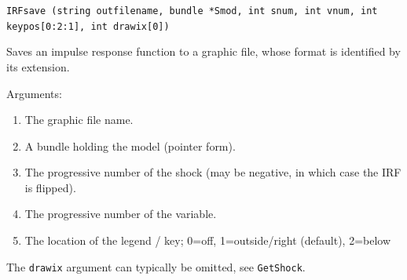 \documentclass[a4paper,10pt]{article}
\newenvironment{funcdoc}[1]
{\noindent\hrulefill\newline\nopagebreak\texttt{#1}%
\nopagebreak\par\noindent\hrulefill%
\nopagebreak\par\nopagebreak\smallskip\nopagebreak\par}
{\bigskip}
\begin{document}

\begin{funcdoc}{IRFsave (string outfilename, bundle *Smod, int snum, int vnum, 
int keypos[0:2:1], int drawix[0])}
   \noindent Saves an impulse response function to a graphic file, whose format is
  identified by its extension. 
    
  \noindent Arguments:
  
  \begin{enumerate}
  \item The graphic file name.
  \item A bundle holding the model (pointer form).
  \item The progressive number of the shock (may be negative, in which
    case the IRF is flipped).
  \item The progressive number of the variable.
  \item The location of the legend / key; 0=off, 1=outside/right (default), 2=below
  \end{enumerate}
  
   The \texttt{drawix} argument can typically be omitted, see \texttt{GetShock}.
\end{funcdoc}
\end{document}
